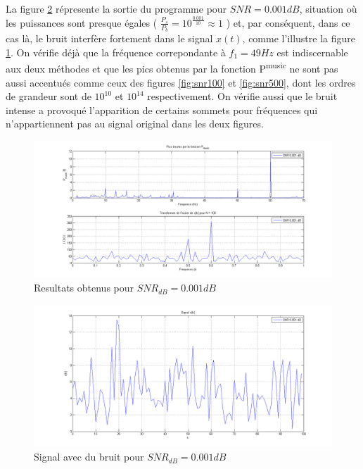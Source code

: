 \documentclass{article}
\newcommand{\rapportFigure}{0.45}
\begin{document}
\vspace*{10pt}

La figure \ref{fig:snr0001} répresente la sortie du programme pour \(SNR = 0.001dB\), situation où les puissances sont presque égales ( \( \frac{P_s}{P_b} = 10^{\frac{0.001}{10}} \approx 1 \) ) et, par conséquent, dans ce cas là, le bruit interfère fortement dans le signal \(x(t)\), comme l'illustre la figure \ref{fig:wave0001}. On vérifie déjà que la fréquence correpondante à \( f_1 = 49Hz\) est indiscernable aux deux méthodes et que les pics obtenus par la fonction P\textsuperscript{music} ne sont pas aussi accentués comme ceux des figures \ref{fig:snr100} et \ref{fig:snr500}, dont les ordres de grandeur sont de \(10^{10}\) et \(10^{14}\) respectivement. On vérifie aussi que le bruit intense a provoqué l'apparition de certains sommets pour fréquences qui n'appartiennent pas au signal original dans les deux figures.

%
\begin{figure}[h]
    \centering
    \includegraphics[scale= \rapportFigure]{images/snr0001}
    \caption{Resultats obtenus pour \(SNR_{dB} = 0.001 dB\)}
    \label{fig:wave0001}
\end{figure}
%


%
\begin{figure}[h]
    \centering
    \includegraphics[scale= \rapportFigure ]{images/wave0001}
    \caption{Signal avec du bruit pour \(SNR_{dB} = 0.001 dB\)}
    \label{fig:snr0001}
\end{figure}
%
\end{document}
